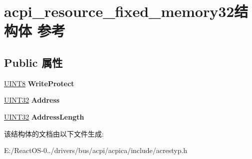 \hypertarget{structacpi__resource__fixed__memory32}{}\section{acpi\+\_\+resource\+\_\+fixed\+\_\+memory32结构体 参考}
\label{structacpi__resource__fixed__memory32}
\subsection*{Public 属性}
\begin{DoxyCompactItemize}
\item 
\mbox{\label{structacpi__resource__fixed__memory32_a3bf75bde02f4c22c3057763090563e10}} 
\hyperlink{_processor_bind_8h_ab27e9918b538ce9d8ca692479b375b6a}{U\+I\+N\+T8} {\bfseries Write\+Protect}
\item 
\mbox{\label{structacpi__resource__fixed__memory32_a40c96408661edac462b3ba843745e988}} 
\hyperlink{_processor_bind_8h_ae1e6edbbc26d6fbc71a90190d0266018}{U\+I\+N\+T32} {\bfseries Address}
\item 
\mbox{\label{structacpi__resource__fixed__memory32_a5e1c3c287c567dfad0a52904af24a0e6}} 
\hyperlink{_processor_bind_8h_ae1e6edbbc26d6fbc71a90190d0266018}{U\+I\+N\+T32} {\bfseries Address\+Length}
\end{DoxyCompactItemize}


该结构体的文档由以下文件生成\+:\begin{DoxyCompactItemize}
\item 
E\+:/\+React\+O\+S-\/0../drivers/bus/acpi/acpica/include/acrestyp.\+h\end{DoxyCompactItemize}
